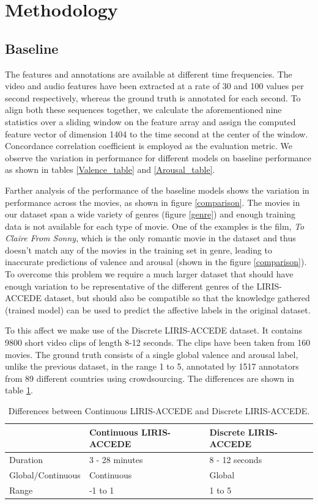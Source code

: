 \documentclass{article}
\begin{document}
\section{Methodology}


\subsection{Baseline}
The features and annotations are available at different time frequencies. The video and audio features have been extracted at a rate of 30 and 100 values per second respectively, whereas the ground truth is annotated for each second. To align both these sequences together, we calculate the aforementioned nine statistics over a sliding window on the feature array and assign the computed feature vector of dimension 1404 to the time second at the center of the window. Concordance correlation coefficient is employed as the evaluation metric. We observe the variation in performance for different models on baseline performance as shown in tables \ref{Valence_table} and \ref{Arousal_table}. 

\indent Farther analysis of the performance of the baseline models shows the variation in performance across the movies, as shown in figure \ref{comparison}. The movies in our dataset span a wide variety of genres (figure \ref{genre}) and enough training data is not available for each type of movie. One of the examples is the film, \textit{To Claire From Sonny}, which is the only romantic movie in the dataset and thus doesn't match any of the movies in the training set in genre, leading to inaccurate predictions of valence and arousal (shown in the figure \ref{comparison}). To overcome this problem we require a much larger dataset that should have enough variation to be representative of the different genres of the LIRIS-ACCEDE dataset, but should also be compatible so that the knowledge gathered (trained model) can be used to predict the affective labels in the original dataset.

\indent To this affect we make use of the Discrete LIRIS-ACCEDE dataset. It contains 9800 short video clips of length 8-12 seconds. The clips have been taken from 160 movies. The ground truth consists of a single global valence and arousal label, unlike the previous dataset, in the range 1 to 5, annotated by 1517 annotators from 89 different countries using crowdsourcing. The differences are shown in table \ref{differences}.

\begin{table}[h]
\centering
\begin{tabular}{|l|p{2.2cm}|p{2.2cm}|}
\hline
				& Continuous LIRIS-ACCEDE	& Discrete LIRIS-ACCEDE \\ \hline
Duration			& 3 - 28 minutes			& 8 - 12 seconds		\\ \hline	
Global/Continuous	& Continuous				& Global 				\\ \hline
Range			& -1 to 1					& 1 to 5				\\ \hline
\end{tabular}
\caption{Differences between Continuous LIRIS-ACCEDE and Discrete LIRIS-ACCEDE.}
\label{differences}
\end{table}
\end{document}
